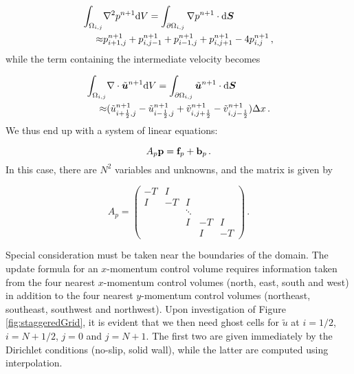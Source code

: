 \documentclass[final,3p,twocolumn]{elsarticle}
\begin{document}
\begin{align}
    \nonumber
    \int_{\Omega_{i,j}} & \nabla^2 p^{n+1} {\rm d}V = 
    \int_{\partial \Omega_{i,j}} \nabla p^{n+1} \cdot {\rm d}\bm{S} \\
    \approx& p_{i+1,j}^{n+1} + p_{i,j-1}^{n+1} + p_{i-1,j}^{n+1} +
    p_{i,j+1}^{n+1} -4 p_{i,j}^{n+1} \,,
\end{align}
%
while the term containing the intermediate velocity becomes 

\begin{align}
    \nonumber
    \int_{\Omega_{i,j}} & \nabla \cdot \tilde{\bm{u}}^{n+1} {\rm d}V = 
    \int_{\partial \Omega_{i,j}} \tilde{\bm{u}}^{n+1} \cdot {\rm d}\bm{S} \\
    \approx& (\tilde{u}_{i+\frac{1}{2},j}^{n+1} -
    \tilde{u}_{i-\frac{1}{2},j}^{n+1} + \tilde{v}_{i,j+\frac{1}{2}}^{n+1} -
    \tilde{v}_{i,j-\frac{1}{2}}^{n+1}) \Delta x \,.
\end{align}
%
We thus end up with a system of linear equations: 

\begin{equation}
    A_p {\bf p} = {\bf f}_p + {\bf b}_p \,.
    \label{eq:pressureMatrix}
\end{equation}
%
In this case, there are $N^2$ variables and unknowns, and the matrix is given
by 

\begin{equation*}
    A_p = 
    \begin{pmatrix}
        -T & I \\
        I & -T & I \\
        & & \ddots \\ 
        & & I & -T & I \\
        & & & I & -T
    \end{pmatrix} \,.
\end{equation*}

Special consideration must be taken near the boundaries of the domain. The
update formula for an $x$-momentum control volume requires information taken
from the four nearest $x$-momentum control volumes (north, east, south and
west) in addition to the four nearest $y$-momentum control volumes (northeast,
southeast, southwest and northwest). Upon investigation of Figure
\ref{fig:staggeredGrid}, it is evident that we then need ghost cells for
$\tilde{u}$ at $i=1/2$, $i=N+1/2$, $j=0$ and $j=N+1$. The first two are given
immediately by the Dirichlet conditions (no-slip, solid wall), while the latter
are computed using interpolation. 
\end{document}
